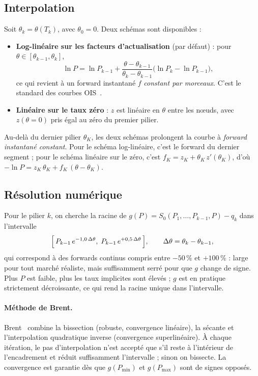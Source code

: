 \documentclass[11pt,a4paper]{article}
\theoremstyle{plain}
\theoremstyle{definition}
\theoremstyle{remark}
\begin{document}
\subsection{Interpolation}

Soit $\theta_k=\theta(T_k)$, avec $\theta_0=0$. Deux schémas sont disponibles :
\begin{itemize}
  \item \textbf{Log-linéaire sur les facteurs d'actualisation} (par défaut) : pour
        $\theta\in[\theta_{k-1},\theta_k]$,
        \[\ln P=\ln P_{k-1}+\frac{\theta-\theta_{k-1}}{\theta_k-\theta_{k-1}}\bigl(\ln P_k-\ln P_{k-1}\bigr),\]
        ce qui revient à un forward instantané $f$ \emph{constant par morceaux}. C'est le standard des
        courbes OIS~\cite{hagan2006}.
  \item \textbf{Linéaire sur le taux zéro} : $z$ est linéaire en $\theta$ entre les nœuds, avec
        $z(\theta\!=\!0)$ pris égal au zéro du premier pilier.
\end{itemize}
Au-delà du dernier pilier $\theta_K$, les deux schémas prolongent la courbe à \emph{forward instantané
constant}. Pour le schéma log-linéaire, c'est le forward du dernier segment ; pour le schéma
linéaire sur le zéro, c'est $f_K=z_K+\theta_K\,z'(\theta_K)$, d'où
$-\ln P=z_K\,\theta_K+f_K\,(\theta-\theta_K)$.

\subsection{Résolution numérique}

Pour le pilier $k$, on cherche la racine de
$g(P)=S_0(P_1,\dots,P_{k-1},P)-q_k$ dans l'intervalle
\[
  \Bigl[\,P_{k-1}\,e^{-1{,}0\,\Delta\theta},\;P_{k-1}\,e^{+0{,}5\,\Delta\theta}\,\Bigr],
  \qquad \Delta\theta=\theta_k-\theta_{k-1},
\]
qui correspond à des forwards continus compris entre $-50\,\%$ et $+100\,\%$ : large pour tout
marché réaliste, mais suffisamment serré pour que $g$ change de signe. Plus $P$ est faible, plus les
taux implicites sont élevés ; $g$ est en pratique strictement décroissante, ce qui rend la racine
unique dans l'intervalle.

\paragraph{Méthode de Brent.} Brent~\cite{brent1973} combine la bissection (robuste, convergence
linéaire), la sécante et l'interpolation quadratique inverse (convergence superlinéaire). À chaque
itération, le pas d'interpolation n'est accepté que s'il reste à l'intérieur de l'encadrement et
réduit suffisamment l'intervalle ; sinon on bissecte. La convergence est garantie dès que
$g(P_{\min})$ et $g(P_{\max})$ sont de signes opposés.
\end{document}
